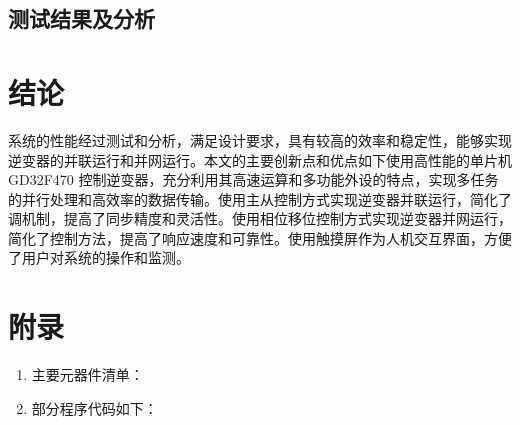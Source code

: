 \documentclass[a4paper,12pt]{article}
\begin{document}
\subsection{测试结果及分析}

\newpage

\section{结论}
系统的性能经过测试和分析，满足设计要求，具有较高的效率和稳定性，能够实现逆变器的并联运行和并网运行。本文的主要创新点和优点如下使用高性能的单片机 GD32F470 控制逆变器，充分利用其高速运算和多功能外设的特点，实现多任务的并行处理和高效率的数据传输。使用主从控制方式实现逆变器并联运行，简化了调机制，提高了同步精度和灵活性。使用相位移位控制方式实现逆变器并网运行，简化了控制方法，提高了响应速度和可靠性。使用触摸屏作为人机交互界面，方便了用户对系统的操作和监测。

\newpage

\appendix
\section{附录}
\begin{enumerate}
    \item 主要元器件清单：
    \item 部分程序代码如下：
\end{enumerate}

\end{document}

